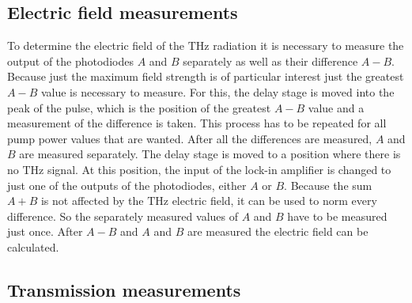 \subsection{Electric field measurements}
\label{sec:field}
To determine the electric field of the $\si{\tera\hertz}$ radiation it is necessary to measure the output of the photodiodes $A$ and $B$ separately as well as their difference $A-B$.
Because just the maximum field strength is of particular interest just the greatest $A-B$ value is necessary to measure.
For this, the delay stage is moved into the peak of the pulse, which is the position of the greatest $A-B$ value and a measurement of the difference is taken.
This process has to be repeated for all pump power values that are wanted.
After all the differences are measured, $A$ and $B$ are measured separately.
The delay stage is moved to a position where there is no $\si{\tera\hertz}$ signal.
At this position, the input of the lock-in amplifier is changed to just one of the outputs of the photodiodes, either $A$ or $B$.
Because the sum $A+B$ is not affected by the $\si{\tera\hertz}$ electric field, it can be used to norm every difference.
So the separately measured values of $A$ and $B$ have to be measured just once.
After $A-B$ and $A$ and $B$ are measured the electric field can be calculated.





\subsection{Transmission measurements}
